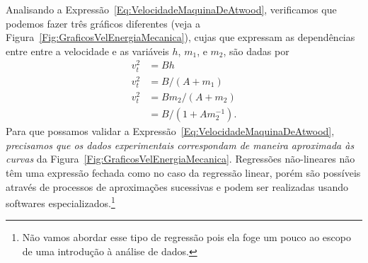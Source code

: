 Analisando a Expressão~\eqref{Eq:VelocidadeMaquinaDeAtwood}, verificamos que podemos fazer três gráficos diferentes (veja a Figura~\ref{Fig:GraficosVelEnergiaMecanica}), cujas que expressam as dependências entre entre a velocidade e as variáveis $h$, $m_1$, e $m_2$, são dadas por
\begin{align}
    v_t^2 &= B h \\
    v_t^2 &= B / (A + m_1) \\
    v_t^2 &= B m_2 / (A + m_2) \\
    &= B / (1 + A m_2^{-1}).
\end{align}
%
Para que possamos validar a Expressão~\eqref{Eq:VelocidadeMaquinaDeAtwood}, \emph{precisamos que os dados experimentais correspondam de maneira aproximada às curvas} da Figura~\ref{Fig:GraficosVelEnergiaMecanica}. Regressões não-lineares não têm uma expressão fechada como no caso da regressão linear, porém são possíveis através de processos de aproximações sucessivas e podem ser realizadas usando softwares especializados.\footnote[][-2cm]{Não vamos abordar esse tipo de regressão pois ela foge um pouco ao escopo de uma introdução à análise de dados.} 
\begin{figure*}[!h]
\caption{Curvas que expressão a dependência da velocidade ao quadrado com $h$, $m_1$, e $m_2$ para o sistema retratado na Figura~\label{Fig:MaquinaAtwoodHorizEnergia}.\label{Fig:GraficosVelEnergiaMecanica}}
\end{figure*}

